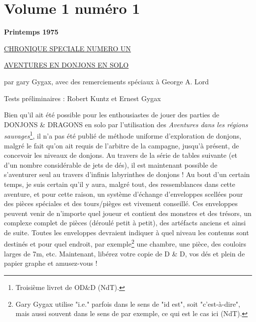 \newpage
{}\section*{Volume 1 numéro 1}
\label{sr11}

\bigskip

\begin{center}
{\LARGE \textbf{Printemps 1975}}
\end{center}

\bigskip\bigskip

\begin{center}
\underline{\underline{CHRONIQUE SPECIALE NUMERO UN}}
\end{center}

\bigskip

\begin{center}
\underline{AVENTURES EN DONJONS EN SOLO}
\end{center}

\bigskip

par gary Gygax, avec des remerciements spéciaux à George A. Lord

Tests préliminaires : Robert Kuntz et Ernest Gygax

\medskip

Bien qu'il ait été possible pour les enthousiastes de jouer des parties de DONJONS \& DRAGONS en solo par l'utilisation des \textit{Aventures dans les régions sauvages}\footnote{Troisième livret de OD\&D (NdT).}, il n'a pas été publié de méthode uniforme d'exploration de donjons, malgré le fait qu'on ait requis de l'arbitre de la campagne, jusqu'à présent, de concevoir les niveaux de donjons. Au travers de la série de tables suivante (et d'un nombre considérable de jets de dés), il est maintenant possible de s'aventurer seul au travers d'infinis labyrinthes de donjons ! Au bout d'un certain temps, je suis certain qu'il y aura, malgré tout, des ressemblances dans cette aventure, et pour cette raison, un système d'échange d'enveloppes scellées pour des pièces spéciales et des tours/pièges est vivement conseillé. Ces enveloppes peuvent venir de n'importe quel joueur et contient des monstres et des trésors, un complexe complet de pièces (déroulé petit à petit), des artéfacts anciens et ainsi de suite. Toutes les enveloppes devraient indiquer à quel niveau les contenus sont destinés et pour quel endroit, par exemple\footnote{Gary Gygax utilise "i.e." parfois dans le sens de "id est", soit "c'est-à-dire", mais aussi souvent dans le sens de par exemple, ce qui est le cas ici (NdT).} une chambre, une pièce, des couloirs larges de 7m, etc. Maintenant, libérez votre copie de D \& D, vos dés et plein de papier graphe et amusez-vous !


